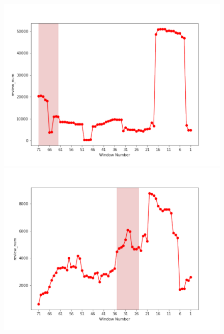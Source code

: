 \documentclass[submit]{ipsj}
\begin{document}
\begin{figure}[t]
\centering
\begin{minipage}[b]{0.65\columnwidth}
    \centering
    \includegraphics[width=1\columnwidth]{Uenaka_fig/RQ2_kousatu/Neutron_review_num.pdf}
\end{minipage}
\begin{minipage}[b]{0.65\columnwidth}
    \centering
    \includegraphics[width=1\columnwidth]{Uenaka_fig/RQ2_kousatu/Swift_review_num.pdf}
\end{minipage}
\begin{minipage}[b]{0.65\columnwidth}
    \centering

\end{minipage}
\end{figure}
\end{document}

